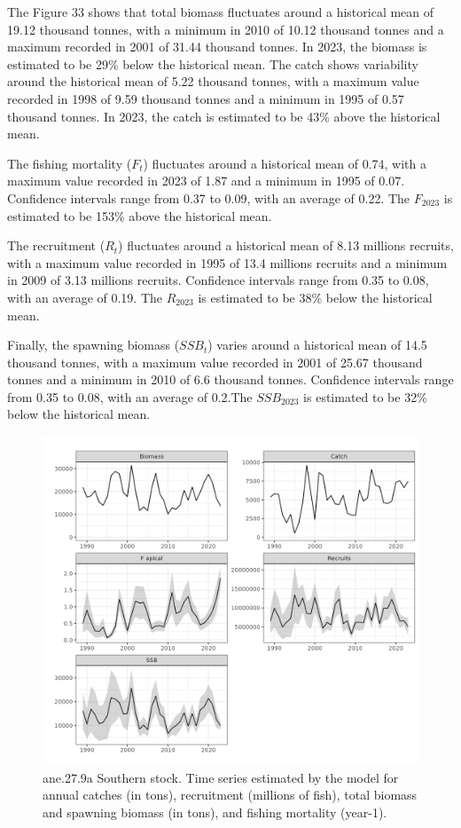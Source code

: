\documentclass[
]{article}
\begin{document}
The Figure 33 shows that total biomass fluctuates around a historical
mean of 19.12 thousand tonnes, with a minimum in 2010 of 10.12 thousand
tonnes and a maximum recorded in 2001 of 31.44 thousand tonnes. In 2023,
the biomass is estimated to be 29\% below the historical mean. The catch
shows variability around the historical mean of 5.22 thousand tonnes,
with a maximum value recorded in 1998 of 9.59 thousand tonnes and a
minimum in 1995 of 0.57 thousand tonnes. In 2023, the catch is estimated
to be 43\% above the historical mean.

The fishing mortality (\(F_t\)) fluctuates around a historical mean of
0.74, with a maximum value recorded in 2023 of 1.87 and a minimum in
1995 of 0.07. Confidence intervals range from 0.37 to 0.09, with an
average of 0.22. The \(F_{2023}\) is estimated to be 153\% above the
historical mean.

The recruitment (\(R_t\)) fluctuates around a historical mean of 8.13
millions recruits, with a maximum value recorded in 1995 of 13.4
millions recruits and a minimum in 2009 of 3.13 millions recruits.
Confidence intervals range from 0.35 to 0.08, with an average of 0.19.
The \(R_{2023}\) is estimated to be 38\% below the historical mean.

Finally, the spawning biomass (\(SSB_{t}\)) varies around a historical
mean of 14.5 thousand tonnes, with a maximum value recorded in 2001 of
25.67 thousand tonnes and a minimum in 2010 of 6.6 thousand tonnes.
Confidence intervals range from 0.35 to 0.08, with an average of 0.2.The
\(SSB_{2023}\) is estimated to be 32\% below the historical mean.

\begin{figure}[H]

{\centering \includegraphics[width=0.95\linewidth]{report/run/S1.0_4FLEETS_SelECO_RecIndex_Mnewfix/fig_time_series} 

}

\caption{ane.27.9a Southern stock. Time series estimated by the model for annual catches (in tons), recruitment (millions of fish), total biomass and spawning biomass (in tons), and fishing mortality (year-1).}\label{fig:unnamed-chunk-39}
\end{figure}
\end{document}

